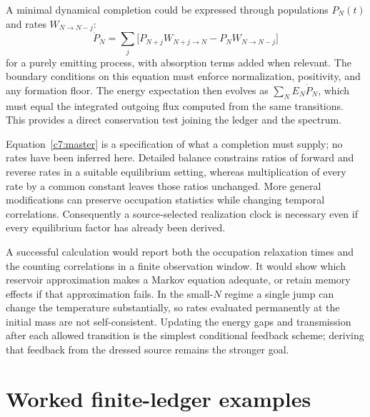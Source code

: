 A minimal dynamical completion could be expressed through populations $P_N(t)$ and rates $W_{N\to N-j}$:
\begin{equation}
 \dot P_N=\sum_j\bigl[P_{N+j}W_{N+j\to N}
                    -P_NW_{N\to N-j}\bigr]
 \label{c7:master}
\end{equation}
for a purely emitting process, with absorption terms added when relevant. The boundary conditions on this equation must enforce normalization, positivity, and any formation floor. The energy expectation then evolves as $\sum_N E_N\dot P_N$, which must equal the integrated outgoing flux computed from the same transitions. This provides a direct conservation test joining the ledger and the spectrum.

Equation~\eqref{c7:master} is a specification of what a completion must supply; no rates have been inferred here. Detailed balance constrains ratios of forward and reverse rates in a suitable equilibrium setting, whereas multiplication of every rate by a common constant leaves those ratios unchanged. More general modifications can preserve occupation statistics while changing temporal correlations. Consequently a source-selected realization clock is necessary even if every equilibrium factor has already been derived.

A successful calculation would report both the occupation relaxation times and the counting correlations in a finite observation window. It would show which reservoir approximation makes a Markov equation adequate, or retain memory effects if that approximation fails. In the small-$N$ regime a single jump can change the temperature substantially, so rates evaluated permanently at the initial mass are not self-consistent. Updating the energy gaps and transmission after each allowed transition is the simplest conditional feedback scheme; deriving that feedback from the dressed source remains the stronger goal.

\section{Worked finite-ledger examples}
